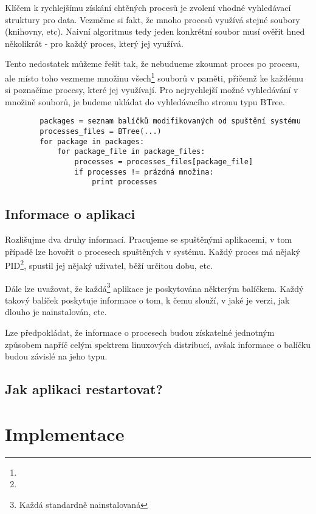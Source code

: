 \documentclass[10pt,a4paper]{article}
\begin{document}
		
		Klíčem k rychlejšímu získání chtěných procesů je zvolení vhodné vyhledávací struktury pro data. Vezměme si fakt, že mnoho procesů využívá stejné soubory (knihovny, etc). Naivní algoritmus tedy jeden konkrétní soubor musí ověřit hned několikrát - pro každý proces, který jej využívá.
		
		Tento nedostatek můžeme řešit tak, že nebudueme zkoumat proces po procesu, ale místo toho vezmeme množinu všech\footnote{} souborů v paměti, přičemž ke každému si poznačíme procesy, které jej využívají. Pro nejrychlejší možné vyhledávání v množině souborů, je budeme ukládat do vyhledávacího stromu typu BTree.
		
		\begin{verbatim}
		packages = seznam balíčků modifikovaných od spuštění systému
		processes_files = BTree(...)
		for package in packages:
		    for package_file in package_files:
		        processes = processes_files[package_file]
		        if processes != prázdná množina:
		            print processes
		\end{verbatim}
		
		
		\subsection{Informace o aplikaci}
		Rozlišujme dva druhy informací. Pracujeme se spuštěnými aplikacemi, v tom případě lze hovořit o procesech spuštěných v systému. Každý proces má nějaký PID\footnote{}, spustil jej nějaký uživatel, běží určitou dobu, etc.
		
		Dále lze uvažovat, že každá\footnote{Každá standardně nainstalovaná} aplikace je poskytována některým balíčkem. Každý takový balíček poskytuje informace o tom, k čemu slouží, v jaké je verzi, jak dlouho je nainstalován, etc.
		
		Lze předpokládat, že informace o procesech budou získatelné jednotným způsobem napříč celým spektrem linuxových distribucí, avšak informace o balíčku budou závislé na jeho typu.
		
		\subsection{Jak aplikaci restartovat?} 
	
	\section{Implementace}
\end{document}
